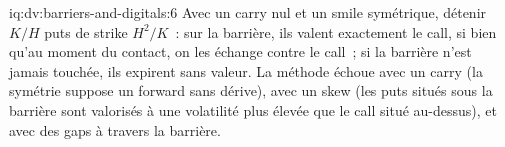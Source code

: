 \begin{solution}{iq:dv:barriers-and-digitals:6}
Avec un carry nul et un smile symétrique, détenir $K/H$ puts de strike $H^2/K$~: sur la barrière, ils valent exactement le call, si bien
qu'au moment du contact, on les échange contre le call~; si la barrière n'est jamais touchée, ils expirent sans valeur. La méthode échoue avec un carry (la symétrie suppose un forward sans dérive),
avec un skew (les puts situés sous la barrière sont valorisés à une volatilité plus élevée que le call situé au-dessus), et avec des gaps à travers la
barrière.
\end{solution}
